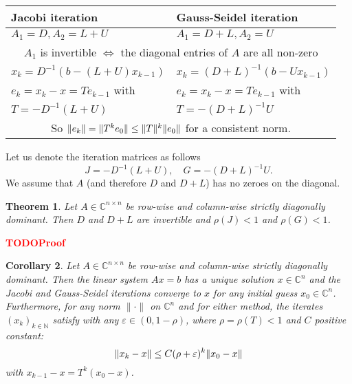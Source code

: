 \documentclass[12pt]{article}
\newcounter{lecture}
\newtheorem{theorem}{Theorem}[lecture]
\newtheorem{corollary}[theorem]{Corollary}
\theoremstyle{definition}
\theoremstyle{remark}
\numberwithin{equation}{section}
\newcommand{\C}{\mathbb{C}}
\newcommand{\N}{\mathbb{N}}
\newcommand{\normempty}{\|\cdot\|}
\newcommand{\TODO}[1][]{\textcolor{red}{\textbf{TODO\ifblank{#1}{}{:\ }#1}}\\}
\DeclarePairedDelimiter{\norm}{\lVert}{\rVert}
\begin{document}
\begin{center}
  \bgroup
  \def\arraystretch{2}%
  \begin{tabular}{l | l}
    Jacobi iteration & Gauss-Seidel iteration \\
    \hline
    $A_1=D, A_2=L+U$ & $A_1=D+L, A_2=U$ \\
    \hline
    \multicolumn{2}{c}{$A_1$ is invertible $\Leftrightarrow$ the diagonal entries of $A$ are all non-zero} \\
    \hline
    $x_k = D^{-1}(b - (L+U)x_{k-1})$ & $x_k = (D+L)^{-1}(b - Ux_{k-1})$ \\
    $e_k = x_k - x = T e_{k-1}$ with & $e_k = x_k - x = T e_{k-1}$ with \\
    $T = -D^{-1}(L+U)$ & $T = -(D+L)^{-1}U$ \\
    \hline
    \multicolumn{2}{c}{So $\norm{e_k} = \norm{T^k e_0} \leq \norm{T}^k \norm{e_0}$ for a consistent norm.}
  \end{tabular}
  \egroup
\end{center}

Let us denote the iteration matrices as follows
\begin{equation*}
  J = -D^{-1}(L+U),\quad G = -(D+L)^{-1}U.
\end{equation*}
We assume that $A$ (and therefore $D$ and $D+L$) has no zeroes on the diagonal.


\begin{theorem}
  Let $A \in \C^{n\times n}$ be row-wise and column-wise strictly diagonally dominant. Then $D$ and $D+L$ are invertible and $\rho(J) < 1$ and $\rho(G) < 1$.
\end{theorem}
\TODO[Proof]

\begin{corollary}
  Let $A \in \C^{n\times n}$ be row-wise and column-wise strictly diagonally dominant. Then the linear system $Ax = b$ has a unique solution $x \in \C^n$ and the Jacobi and Gauss-Seidel iterations converge to $x$ for any initial guess $x_0 \in \C^n$. Furthermore, for any norm $\normempty$ on $\C^n$ and for either method, the iterates $(x_k)_{k \in \N}$ satisfy with any $\varepsilon \in (0, 1-\rho)$, where $\rho = \rho(T) < 1$ and $C$ positive constant:
  \begin{equation*}
    \norm{x_k - x} \leq C (\rho + \varepsilon)^k \norm{x_0 - x}
  \end{equation*}
  with $x_{k-1} - x = T^k (x_0 - x)$.
\end{corollary}
\end{document}
